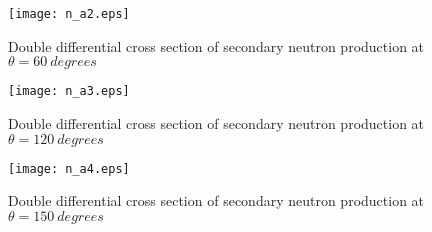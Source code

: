 \documentclass[12pt]{article}
\begin{document}
\begin{figure}[htbp]
\caption{Double differential cross section of secondary neutron production at $\theta = 60~degrees$}
\label{figa2} 
\centerline{\texttt{[image: n\_a2.eps]}}
\end{figure}

\begin{figure}[htbp]
\caption{Double differential cross section of secondary neutron production at $\theta = 120~degrees$}
\label{figa3} 
\centerline{\texttt{[image: n\_a3.eps]}}
\end{figure}

\begin{figure}[htbp]
\caption{Double differential cross section of secondary neutron production at $\theta = 150~degrees$}
\label{figa4} 
\centerline{\texttt{[image: n\_a4.eps]}}
\end{figure}
\end{document}
